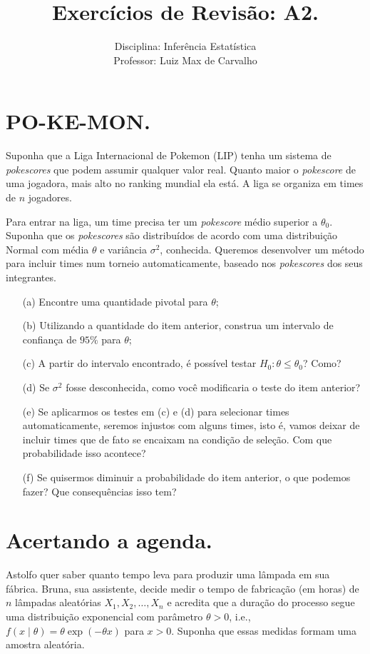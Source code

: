 \documentclass[a4paper,12pt, notitlepage]{report}
\title{Exercícios de Revisão: A2.}
\author{Disciplina: Inferência Estatística \\ Professor: Luiz Max de Carvalho}
\newcommand{\rs}{X_1, X_2, \ldots, X_n} %
\begin{document}
\maketitle

\section{PO-KE-MON.}
Suponha que a Liga Internacional de Pokemon (LIP) tenha um sistema de \textit{pokescores} que podem assumir qualquer valor real. 
Quanto maior o \textit{pokescore} de uma jogadora, mais alto no ranking mundial ela está.
A liga se organiza em times de $n$ jogadores.

Para entrar na liga, um time precisa ter um \textit{pokescore} médio superior a $\theta_0$.
Suponha que os \textit{pokescores} são distribuídos de acordo com uma distribuição Normal com média $\theta$ e variância $\sigma^2$, conhecida.
Queremos desenvolver um método para incluir times num torneio automaticamente, baseado nos \textit{pokescores} dos seus integrantes.

\begin{itemize}
 \item[(a)] Encontre uma quantidade pivotal para $\theta$;
 \item[(b)] Utilizando a quantidade do item anterior, construa um intervalo de confiança de $95\%$ para $\theta$;
 \item[(c)] A partir do intervalo encontrado, é possível testar $H_0: \theta \leq \theta_0$? Como?
 \item[(d)] Se $\sigma^2$ fosse desconhecida, como você modificaria o teste do item anterior?
 \item[(e)] Se aplicarmos os testes em (c) e (d) para selecionar times automaticamente, seremos injustos com alguns times, isto é, vamos deixar de incluir times que de fato se encaixam na condição de seleção.
 Com que probabilidade isso acontece?
 \item[(f)] Se quisermos diminuir a probabilidade do item anterior, o que podemos fazer? Que consequências isso tem?
 \end{itemize}


\section{Acertando a agenda.}

Astolfo quer saber quanto tempo leva para produzir uma lâmpada em sua fábrica.
Bruna, sua assistente, decide medir o tempo de fabricação (em horas) de $n$ lâmpadas aleatórias $\rs$ e acredita que a duração do processo  segue uma distribuição exponencial com parâmetro $\theta>0$, i.e., $f(x \mid \theta) = \theta\exp(-\theta x)$ para $x>0$.
Suponha que essas medidas formam uma amostra aleatória.
\end{document}
